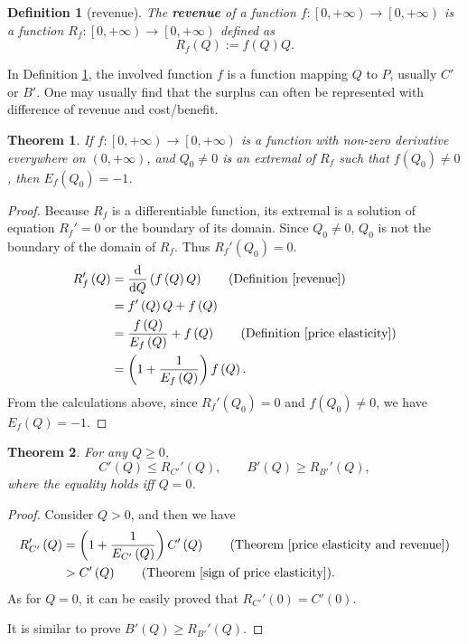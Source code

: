 \documentclass{article}
\newtheorem{theorem}{Theorem}
\newtheorem{definition}{Definition}
\begin{document}
\begin{definition}[revenue]
\label{revenue}
The \textbf{revenue} of a function $f:\left[0,+\infty\right)\to\left[0,+\infty\right)$ is a function $R_f:\left[0,+\infty\right)\to\left[0,+\infty\right)$ defined as
$$R_f\left(Q\right):=f\left(Q\right)Q.$$
\end{definition}

In Definition \ref{revenue}, the involved function $f$ is a function mapping $Q$ to $P$, usually $C'$ or $B'$.
One may usually find that the surplus can often be represented with difference of revenue and cost/benefit.

\begin{theorem}
\label{price elasticity and revenue}
If $f:\left[0,+\infty\right)\to\left[0,+\infty\right)$ is a function with non-zero derivative everywhere on $\left(0,+\infty\right)$, and $Q_0\ne0$ is an extremal of $R_f$ such that $f\left(Q_0\right)\ne0$, then $E_f\left(Q_0\right)=-1$.
\end{theorem}
\begin{proof}
Because $R_f$ is a differentiable function, its extremal is a solution of equation $R_f'=0$ or the boundary of its domain.
Since $Q_0\ne0$, $Q_0$ is{} not the boundary of the domain of $R_f$.
Thus $R_f'\left(Q_0\right)=0$.
\begin{align*}
R_f'\left(Q\right)&=\frac{\mathrm d}{\mathrm dQ}\left(f\left(Q\right)Q\right)\qquad\text{(Definition \ref{revenue})}\\
&=f'\left(Q\right)Q+f\left(Q\right)\\
&=\frac{f\left(Q\right)}{E_f\left(Q\right)}+f\left(Q\right)\qquad\text{(Definition \ref{price elasticity})}\\
&=\left(1+\frac1{E_f\left(Q\right)}\right)f\left(Q\right).
\end{align*}
From the calculations above, since $R_f'\left(Q_0\right)=0$ and $f\left(Q_0\right)\ne0$, we have $E_f\left(Q\right)=-1$.
\end{proof}

\begin{theorem}
\label{inequality of revenue and supply and demand}
For any $Q\ge0$,
$$C'\left(Q\right)\le R_{C'}'\left(Q\right),
\qquad B'\left(Q\right)\ge R_{B'}'\left(Q\right),$$
where the equality holds iff $Q=0$.
\end{theorem}
\begin{proof}
Consider $Q>0$, and then we have
\begin{align*}
R_{C'}'\left(Q\right)&=\left(1+\frac1{E_{C'}\left(Q\right)}\right)C'\left(Q\right)\qquad\text{(Theorem \ref{price elasticity and revenue})}\\
&>C'\left(Q\right)\qquad\text{(Theorem \ref{sign of price elasticity})}.
\end{align*}
As for $Q=0$, it can be easily proved that $R_{C'}'\left(0\right)=C'\left(0\right)$.

It is similar to prove $B'\left(Q\right)\ge R_{B'}'\left(Q\right)$.
\end{proof}
\end{document}
